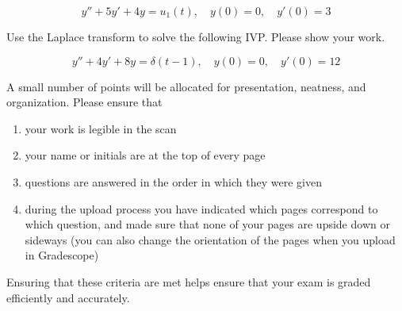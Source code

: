 \documentclass[12pt]{exam}
\begin{document}
\begin{questions}
    $$ y''+ 5y'+4y =  u_{1}(t), \quad y(0) = 0, \quad y'(0) = 3$$ %
        
    \newpage
    
    \question[10] Use the Laplace transform to solve the following IVP. Please show your work. 

    $$ y''+ 4y'+8y =  \delta(t - 1), \quad y(0) = 0, \quad y'(0) = 12$$ %
        
    
    
    
    \newpage \Initials
    
    \question[1] A small number of points will be allocated for presentation, neatness, and organization. Please ensure that
    \begin{enumerate}
        \item your work is legible in the scan
        \item your name or initials are at the top of every page
        \item questions are answered in the order in which they were given
        \item during the upload process you have indicated which pages correspond to which question, and made sure that none of your pages are upside down or sideways (you can also change the orientation of the pages when you upload in Gradescope)
    \end{enumerate}
    Ensuring that these criteria are met helps ensure that your exam is graded efficiently and accurately. 
    


    
\end{questions}
    
\end{document}
